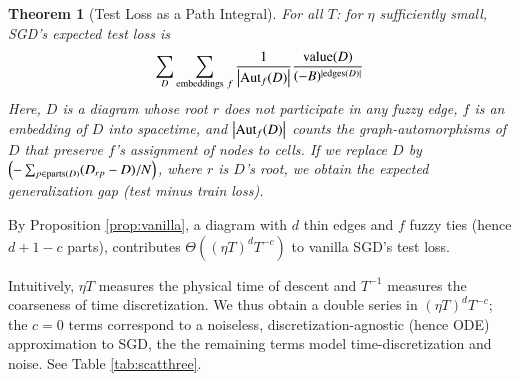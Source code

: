 \documentclass{article}
\theoremstyle{plain}
\newtheorem{thm}{Theorem}
\theoremstyle{definition}
\newtheorem{exm}{Example}
\newcommand{\wrap}[1]{\left(#1\right)}
\newcommand{\wabs}[1]{\left|#1\right|}
\newcommand{\Aut}{\text{\textnormal{Aut}}}
\newcommand{\dvalue}{\text{\textnormal{value}}}
\newcommand{\edges}{\text{\textnormal{edges}}}
\newcommand{\parts}{\text{\textnormal{parts}}}
\begin{document}
        \begin{thm}[Test Loss as a Path Integral] \label{thm:sgdcoef}
            For all $T$: for $\eta$ sufficiently small, SGD's expected test
            loss is
            \begin{equation*}\label{eq:sgdcoef}
                \sum_{D}
                    \sum_{\text{embeddings}~f}
                    \frac{1}{\wabs{\Aut_f(D)}}
                \frac{\dvalue(D)}{(-B)^{|\edges(D)|}}
            \end{equation*}
            Here, $D$ is a diagram whose root $r$ does not participate in any fuzzy
            edge, $f$ is an embedding of $D$ into spacetime, and
            $\wabs{\Aut_f(D)}$ counts the graph-automorphisms of $D$ that
            preserve $f$'s assignment of nodes to cells.
            If we replace $D$ by 
            $
                \wrap{-\sum_{p \in \parts(D)} (D_{rp} - D)/N}
            $, where $r$ is $D$'s root,
            we obtain the expected generalization gap (test minus train loss).
        \end{thm}
 
        By Proposition \ref{prop:vanilla}, a diagram with $d$ thin edges and
        $f$ fuzzy ties (hence $d+1-c$ parts), contributes $\Theta\wrap{(\eta
        T)^d T^{-c}}$ to vanilla SGD's test loss.  
        
        Intuitively, $\eta T$ measures the physical time of descent and
        $T^{-1}$ measures the coarseness of time discretization.  We thus
        obtain a double series in $(\eta T)^d T^{-c}$; the $c=0$ terms
        correspond to a noiseless, discretization-agnostic (hence ODE)
        approximation to SGD, the the remaining terms model time-discretization
        and noise.  See Table \ref{tab:scatthree}. 



\end{document}

